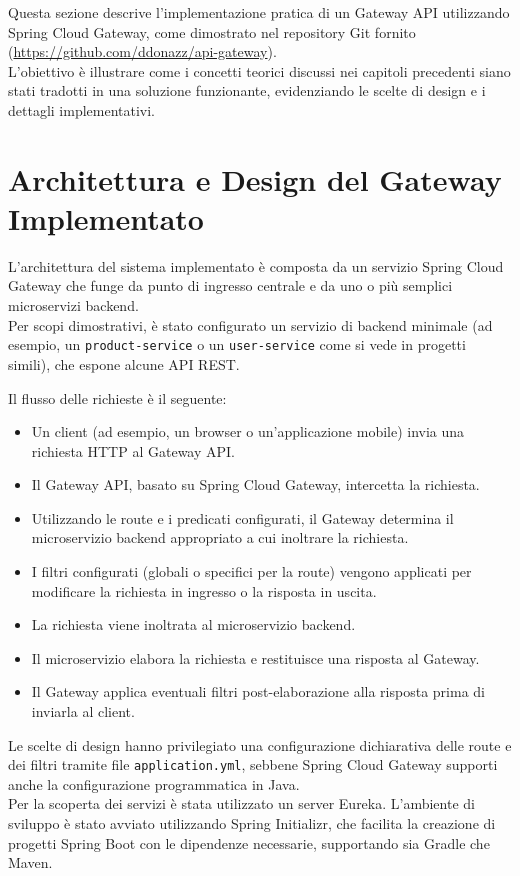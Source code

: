 Questa sezione descrive l'implementazione pratica di un Gateway API utilizzando Spring Cloud Gateway, come dimostrato nel repository Git fornito (\url{https://github.com/ddonazz/api-gateway}). \\
L'obiettivo è illustrare come i concetti teorici discussi nei capitoli precedenti siano stati tradotti in una soluzione funzionante, evidenziando le scelte di design e i dettagli implementativi.

\section{Architettura e Design del Gateway Implementato}

L'architettura del sistema implementato è composta da un servizio Spring Cloud Gateway che funge da punto di ingresso centrale e da uno o più semplici microservizi backend. \\
Per scopi dimostrativi, è stato configurato un servizio di backend minimale (ad esempio, un \texttt{product-service} o un \texttt{user-service} come si vede in progetti simili), che espone alcune API REST.

Il flusso delle richieste è il seguente:
\begin{itemize}
    \item Un client (ad esempio, un browser o un'applicazione mobile) invia una richiesta HTTP al Gateway API.
    \item Il Gateway API, basato su Spring Cloud Gateway, intercetta la richiesta.
    \item Utilizzando le route e i predicati configurati, il Gateway determina il microservizio backend appropriato a cui inoltrare la richiesta.
    \item I filtri configurati (globali o specifici per la route) vengono applicati per modificare la richiesta in ingresso o la risposta in uscita.
    \item La richiesta viene inoltrata al microservizio backend.
    \item Il microservizio elabora la richiesta e restituisce una risposta al Gateway.
    \item Il Gateway applica eventuali filtri post-elaborazione alla risposta prima di inviarla al client.
\end{itemize}

Le scelte di design hanno privilegiato una configurazione dichiarativa delle route e dei filtri tramite file \texttt{application.yml}, sebbene Spring Cloud Gateway supporti anche la configurazione programmatica in Java. \\
Per la scoperta dei servizi è stata utilizzato un server Eureka. L'ambiente di sviluppo è stato avviato utilizzando Spring Initializr, che facilita la creazione di progetti Spring Boot con le dipendenze necessarie, supportando sia Gradle che Maven.

